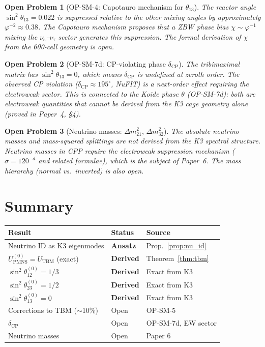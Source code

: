 \documentclass[11pt]{article}
\newtheorem{openproblem}{Open Problem}
\newcommand{\phig}{\varphi}
\newcommand{\PMNS}{\mathrm{PMNS}}
\newcommand{\CP}{\mathrm{CP}}
\newcommand{\TBM}{\mathrm{TBM}}
\begin{document}
\begin{openproblem}[OP-SM-4: Capotauro mechanism for $\theta_{13}$]
The reactor angle $\sin^2\theta_{13} = 0.022$ is suppressed relative
to the other mixing angles by approximately $\phig^{-2} \approx 0.38$.
The Capotauro mechanism proposes that a ZBW phase bias
$\chi \sim \phig^{-1}$ mixing the $\nu_e$--$\nu_\tau$ sector generates
this suppression.  The formal derivation of $\chi$ from the 600-cell
geometry is open.
\end{openproblem}

\begin{openproblem}[OP-SM-7d: CP-violating phase $\delta_\CP$]
The tribimaximal matrix has $\sin^2\theta_{13} = 0$, which means
$\delta_\CP$ is undefined at zeroth order.  The observed CP violation
($\delta_\CP \approx 195^\circ$, NuFIT) is a next-order effect requiring
the electroweak sector.  This is connected to the Koide phase
$\theta$ (OP-SM-7d): both are electroweak quantities that cannot be
derived from the K3 cage geometry alone (proved in Paper~4, \S4).
\end{openproblem}

\begin{openproblem}[Neutrino masses: $\Delta m_{21}^2$, $\Delta m_{32}^2$]
The absolute neutrino masses and mass-squared splittings are not
derived from the K3 spectral structure.  Neutrino masses in CPP
require the electroweak suppression mechanism ($\sigma = 120^{-d}$
and related formulae), which is the subject of Paper~6.  The
mass hierarchy (normal vs.\ inverted) is also open.
\end{openproblem}

\section{Summary}

\begin{center}
\renewcommand{\arraystretch}{1.3}
\begin{tabular}{p{5.5cm}lp{4.5cm}}
\toprule
Result & Status & Source \\
\midrule
Neutrino ID as K3 eigenmodes & \textbf{Ansatz} & Prop.~\ref{prop:nu_id} \\
$U_\PMNS^{(0)} = U_\TBM$ (exact) & \textbf{Derived} & Theorem~\ref{thm:tbm} \\
$\sin^2\theta_{12}^{(0)} = 1/3$ & \textbf{Derived} & Exact from K3 \\
$\sin^2\theta_{23}^{(0)} = 1/2$ & \textbf{Derived} & Exact from K3 \\
$\sin^2\theta_{13}^{(0)} = 0$ & \textbf{Derived} & Exact from K3 \\
Corrections to TBM ($\sim$10\%) & Open & OP-SM-5 \\
$\delta_\CP$ & Open & OP-SM-7d, EW sector \\
Neutrino masses & Open & Paper 6 \\
\bottomrule
\end{tabular}
\end{center}
\end{document}
